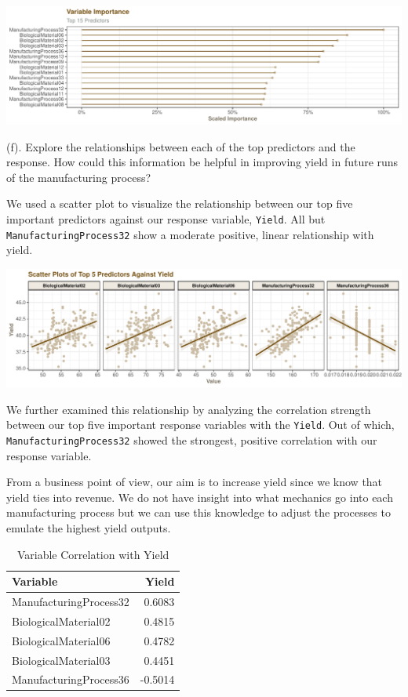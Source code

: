\documentclass[]{report}
\begin{document}
\includegraphics{Homework-Two_files/figure-latex/kj-6.3e-1.pdf}

\begin{subquestion}{(f).} Explore the relationships between each of the top predictors and the response. How could this information be helpful in improving yield in future runs of the manufacturing process?
\end{subquestion}

We used a scatter plot to visualize the relationship between our top
five important predictors against our response variable, \texttt{Yield}.
All but \texttt{ManufacturingProcess32} show a moderate positive, linear
relationship with yield.

\includegraphics{Homework-Two_files/figure-latex/kj-6.3f-1-1.pdf}

We further examined this relationship by analyzing the correlation
strength between our top five important response variables with the
\texttt{Yield}. Out of which, \texttt{ManufacturingProcess32} showed the
strongest, positive correlation with our response variable.

From a business point of view, our aim is to increase yield since we
know that yield ties into revenue. We do not have insight into what
mechanics go into each manufacturing process but we can use this
knowledge to adjust the processes to emulate the highest yield outputs.

\begin{table}[H]

\caption{\label{tab:kj-6.3f-2}Variable Correlation with Yield}
\centering
\fontsize{8}{10}\selectfont
\begin{tabular}{lr}
\toprule
\textbf{Variable} & \textbf{Yield}\\
\midrule
\rowcolor{gray!6}  ManufacturingProcess32 & 0.6083\\
BiologicalMaterial02 & 0.4815\\
\rowcolor{gray!6}  BiologicalMaterial06 & 0.4782\\
BiologicalMaterial03 & 0.4451\\
\rowcolor{gray!6}  ManufacturingProcess36 & -0.5014\\
\bottomrule
\end{tabular}
\end{table}
\end{document}

